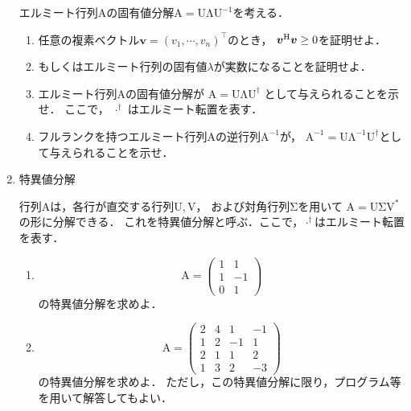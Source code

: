 \begin{enumerate}[label=問\arabic*.]
  \vspace{1mm}
  エルミート行列$\mathrm{A}$の固有値分解$\mathrm{A} = \mathrm{U}\mathrm{\Lambda}\mathrm{U}^{-1}$を考える．
  \begin{enumerate}[label=(\roman*)]
    \item 任意の複素ベクトル$\bm{v}=(v_1, \cdots, v_n)^{\top}$のとき，
      $\bm{v}^{\rm H}\bm{v}\geq0$を証明せよ．
    \item もしくはエルミート行列の固有値$\lambda$が実数になることを証明せよ．
    \item エルミート行列$\mathrm{A}$の固有値分解が
      $\mathrm{A} = \mathrm{U}\mathrm{\Lambda}\mathrm{U}^{\dagger}$ として与えられることを示せ．
      ここで， $\cdot^\dagger$ はエルミート転置を表す．
    \item フルランクを持つエルミート行列$\mathrm{A}$の逆行列$\mathrm{A}^{-1}$が，
      $\mathrm{A}^{-1} = \mathrm{U}\mathrm{\Lambda}^{-1}\mathrm{U}^{\dagger}$として与えられることを示せ．
  \end{enumerate}

  \item 特異値分解

  \vspace{1mm}
  行列$\mathrm{A}$は，各行が直交する行列$\mathrm{U}, \mathrm{V}$，
  および対角行列$\mathrm{\Sigma}$を用いて
  $\mathrm{A}=\mathrm{U}\mathrm{\Sigma}\mathrm{V}^*$の形に分解できる．
  これを特異値分解と呼ぶ．ここで，$\cdot^{\dagger}$はエルミート転置を表す．
  \begin{enumerate}[label=(\roman*)]
    \item
      \begin{equation}
        \mathrm{A} = \left(
          \begin{array}{rr}
            1 & 1 \\
            1 & -1 \\
            0 & 1
          \end{array}
          \right)
      \end{equation}
      の特異値分解を求めよ．
    \item
      \begin{equation}
        \mathrm{A} = \left(
          \begin{array}{rrrr}
            2 & 4 & 1 &-1 \\
            1 & 2 & -1 & 1 \\
            2 & 1 & 1 & 2 \\
            1 & 3 & 2 & -3
          \end{array}
          \right)
      \end{equation}の特異値分解を求めよ．
      ただし，この特異値分解に限り，プログラム等を用いて解答してもよい．
  \end{enumerate}


\end{enumerate}
